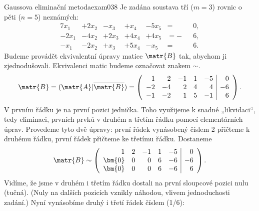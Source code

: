 \begin{mathexam}{Gaussova eliminační metoda}{exam038}
  Je zadána soustava tří (\(m = 3\)) rovnic o pěti (\(n = 5\)) neznámých:
  \begin{alignat*}{7}
       x_1 &+ 2x_2 &-  x_3 &+  x_4 &- 5x_5 &=  &&0, \\
     -2x_1 &- 4x_2 &+ 2x_3 &+ 4x_4 &+ 4x_5 &= -&&6, \\
      -x_1 &- 2x_2 &+  x_3 &+ 5x_4 &-  x_5 &=  &&6.
  \end{alignat*}
  Budeme provádět ekvivalentní úpravy matice \(\matr{B}\) tak, abychom ji zjednodušovali.
  Ekvivalenci matic budeme označovat znakem \(\sim\). 
  \begingroup
    \renewcommand\arraystretch{1.0}
    \renewcommand\arraycolsep{3pt}
    \begin{equation*}
      \matr{B} = (\matr{A}\lvert\overline{\matr{B}}) =
      \left(
        \begin{array}{rrrrr|r}
           1 &  2 & -1 & 1 & -5 &  0    \\
          -2 & -4 &  2 & 4 &  4 & -6    \\
          -1 & -2 &  1 & 5 & -1 &  6
        \end{array}
      \right).
    \end{equation*}
  \endgroup
  V prvním řádku je na první pozici jednička. Toho využijeme k snadné „likvidaci“, tedy eliminaci,
  prvních prvků v druhém a třetím řádku pomocí elementárních úprav. Provedeme tyto dvě úpravy:
  první řádek vynásobený číslem \num{2} přičteme k druhému řádku, první řádek přičteme ke třetímu
  řádku. Dostaneme
  \begingroup
    \renewcommand\arraystretch{1.0}
    \renewcommand\arraycolsep{3pt}
    \begin{equation*}
      \matr{B} \sim
      \left(
        \begin{array}{rrrrr|r}
          1 &  2 & -1 & 1 & -5 &  0         \\
          \bm{0} &  0 &  0 & 6 & -6 & -6    \\
          \bm{0} &  0 &  0 & 6 & -6 &  6
        \end{array}
      \right).
    \end{equation*}
  \endgroup  
  Vidíme, že jsme v druhém i třetím řádku dostali na první sloupcové pozici nulu (tučná). (Nuly na
  dalších  pozicích vznikly náhodou, vlivem jednoduchosti zadání.) Nyní vynásobíme druhý i třetí
  řádek číslem (\num{1/6}):
  \begingroup
    \renewcommand\arraystretch{1.0}
    \renewcommand\arraycolsep{3pt}    
    \begin{equation*}

\end{equation*}
\end{mathexam}
